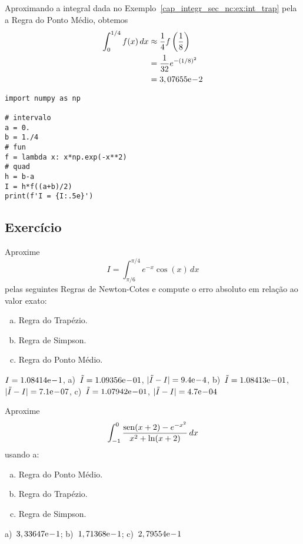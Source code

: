 \begin{ex}\label{cap_integr_sec_nc:ex:int_pto_medio}
  Aproximando a integral dada no Exemplo~\ref{cap_integr_sec_nc:ex:int_trap} pela a Regra do Ponto Médio, obtemos
  \begin{subequations}
    \begin{align}
      \int_0^{1/4} f(x)\,dx &\approx \frac{1}{4}f\left(\frac{1}{8}\right)\\
                            &= \frac{1}{32}e^{-(1/8)^2}\\
                            &= 3,07655\mathrm{e}\!-\!2
    \end{align}
  \end{subequations}

\begin{lstlisting}
import numpy as np

# intervalo
a = 0.
b = 1./4
# fun
f = lambda x: x*np.exp(-x**2)
# quad
h = b-a
I = h*f((a+b)/2)
print(f'I = {I:.5e}')
\end{lstlisting}
\end{ex}

\subsection{Exercício}

\begin{exer}
  Aproxime
  \begin{equation}
    I = \int_{\pi/6}^{\pi/4} e^{-x}\cos(x)\,dx
  \end{equation}
  pelas seguintes Regras de Newton-Cotes e compute o erro absoluto em relação ao valor exato:
  \begin{enumerate}[a)]
  \item Regra do Trapézio.
  \item Regra de Simpson.
  \item Regra do Ponto Médio.
  \end{enumerate}
\end{exer}
\begin{resp}
  $I = 1.08414\mathrm{e}\!-\!1$, a)~$\tilde{I} = 1.09356\mathrm{e}\!-\!01$, $|\tilde{I}-I| = 9.4\mathrm{e}\!-\!4$, b)~$\tilde{I} = 1.08413\mathrm{e}\!-\!01$, $|\tilde{I}-I| = 7.1\mathrm{e}\!-\!07$, c)~$\tilde{I} = 1.07942\mathrm{e}\!-\!01$, $|\tilde{I}-I| = 4.7\mathrm{e}\!-\!04$
\end{resp}

\begin{exer}
  Aproxime
  \begin{equation}
    \int_{-1}^0 \frac{\operatorname{sen}(x+2)-e^{-x^2}}{x^2+\ln(x+2)}\,dx
  \end{equation}
usando a:
\begin{enumerate}[a)]
\item Regra do Ponto Médio.
\item Regra do Trapézio.
\item Regra de Simpson.
\end{enumerate}
\end{exer}
\begin{resp}
  a)~$3,33647\mathrm{e}\!-\!1$; b)~$1,71368\mathrm{e}\!-\!1$; c)~$2,79554\mathrm{e}\!-\!1$
\end{resp}

